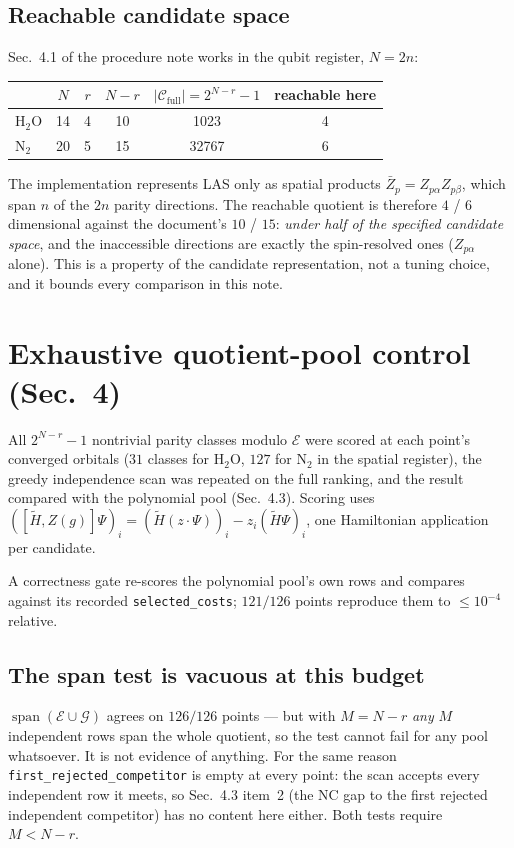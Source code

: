 \subsection{Reachable candidate space}
Sec.~4.1 of the procedure note works in the qubit register, $N = 2n$:
\begin{center}
\begin{tabular}{lccccc}
\toprule
 & $N$ & $r$ & $N-r$ & $|\mathcal C_{\mathrm{full}}| = 2^{N-r}-1$ & reachable here \\
\midrule
$\mathrm{H_2O}$ & 14 & 4 & 10 & 1023 & 4 \\
$\mathrm{N_2}$  & 20 & 5 & 15 & 32767 & 6 \\
\bottomrule
\end{tabular}
\end{center}
The implementation represents LAS only as spatial products
$\bar Z_p = Z_{p\alpha} Z_{p\beta}$, which span $n$ of the $2n$ parity
directions. The reachable quotient is therefore $4$ / $6$ dimensional against
the document's $10$ / $15$: \emph{under half of the specified candidate space},
and the inaccessible directions are exactly the spin-resolved ones
($Z_{p\alpha}$ alone). This is a property of the candidate representation, not
a tuning choice, and it bounds every comparison in this note.

\section{Exhaustive quotient-pool control (Sec.~4)}
\label{sec:exhaustive}

All $2^{N-r}-1$ nontrivial parity classes modulo $\mathcal E$ were scored at
each point's converged orbitals ($31$ classes for $\mathrm{H_2O}$, $127$ for
$\mathrm{N_2}$ in the spatial register), the greedy independence scan was
repeated on the full ranking, and the result compared with the polynomial pool
(Sec.~4.3). Scoring uses
$([\widetilde H, Z(g)]\Psi)_i = (\widetilde H (z\!\cdot\!\Psi))_i - z_i
(\widetilde H\Psi)_i$, one Hamiltonian application per candidate.

A correctness gate re-scores the polynomial pool's own rows and compares
against its recorded \texttt{selected\_costs}; $121/126$ points reproduce them
to $\le 10^{-4}$ relative.

\subsection{The span test is vacuous at this budget}
$\operatorname{span}(\mathcal E \cup \mathcal G)$ agrees on $126/126$ points ---
but with $M = N-r$ \emph{any} $M$ independent rows span the whole quotient, so
the test cannot fail for any pool whatsoever. It is not evidence of anything.
For the same reason \texttt{first\_rejected\_competitor} is empty at every
point: the scan accepts every independent row it meets, so Sec.~4.3 item~2
(the NC gap to the first rejected independent competitor) has no content here
either. Both tests require $M < N-r$.

